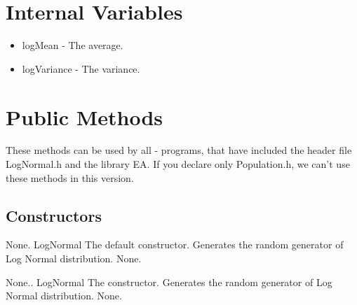 \clearpage

\section{Internal Variables}

\begin{itemize}
\item logMean - The average.
\item logVariance - The variance.
\end{itemize}


\vspace*{10mm}

\section{Public Methods}

\noindent
These methods can be used by all \cpp - programs, that have included the
header file LogNormal.h and the library EA. If you declare only
Population.h, we can't use these methods in this version.

\subsection{Constructors}

\setNormalInstance
\setCorrectWidthThree{8pt}
\printMethodWithParamsSaved
{}
{None.}
{LogNormal}
{The default constructor. Generates the random generator of Log Normal
distribution.}
{None.}
\setCorrectWidthThree{4pt}

\setNormalInstance
\setCorrectWidthThree{8pt}
\printMethodWithParamsSaved
{}
{None..}
{LogNormal}
{The constructor. Generates the random generator of Log Normal distribution.}
{None.}
\setCorrectWidthThree{4pt}

